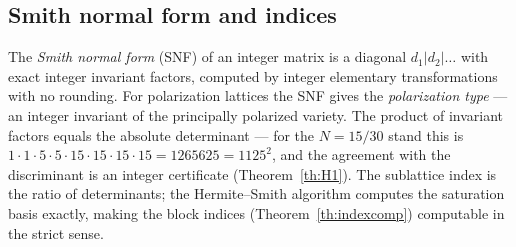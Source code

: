 \subsection{Smith normal form and indices}

The \emph{Smith normal form} (SNF) of an integer matrix is a
diagonal $d_1|d_2|\dots$ with exact integer invariant factors,
computed by integer elementary transformations with no rounding. For
polarization lattices the SNF gives the \emph{polarization type} ---
an integer invariant of the principally polarized variety. The
product of invariant factors equals the absolute determinant ---
for the $N=15/30$ stand this is
$1\cdot1\cdot5\cdot5\cdot15\cdot15\cdot15\cdot15=1265625=1125^2$,
and the agreement with the discriminant is an integer certificate
(Theorem~\ref{th:H1}). The sublattice index is the ratio of
determinants; the Hermite--Smith algorithm computes the saturation
basis exactly, making the block indices
(Theorem~\ref{th:indexcomp}) computable in the strict sense.
